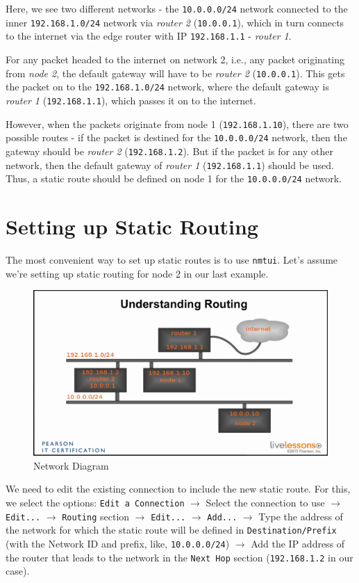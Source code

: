 \noindent
Here, we see two different networks - the \verb|10.0.0.0/24| network connected to the inner \verb|192.168.1.0/24| network via \textit{router 2} (\verb|10.0.0.1|), which in turn connects to the internet via the edge router with IP \verb|192.168.1.1| - \textit{router 1}. 

For any packet headed to the internet on network 2, i.e., any packet originating from \textit{node 2}, the default gateway will have to be \textit{router 2} (\verb|10.0.0.1|). This gets the packet on to the \verb|192.168.1.0/24| network, where the default gateway is \textit{router 1} (\verb|192.168.1.1|), which passes it on to the internet. 

However, when the packets originate from node 1 (\verb|192.168.1.10|), there are two possible routes - if the packet is destined for the \verb|10.0.0.0/24| network, then the gateway should be \textit{router 2} (\verb|192.168.1.2|). But if the packet is for any other network, then the default gateway of \textit{router 1} (\verb|192.168.1.1|) should be used. Thus, a static route should be defined on node 1 for the \verb|10.0.0.0/24| network. 

\section{Setting up Static Routing}
The most convenient way to set up static routes is to use \verb|nmtui|. Let's assume we're setting up static routing for node 2 in our last example.

\begin{figure}[H]
	\centering
	\includegraphics[width=0.9\linewidth]{Mod2/chapters/2.6.a}
	\caption{Network Diagram}
	\label{fig:2}
\end{figure}	

We need to edit the existing connection to include the new static route. For this, we select the options: \verb|Edit a Connection| $\rightarrow$ Select the connection to use $\rightarrow$ \verb|Edit...| $\rightarrow$ \verb|Routing| section $\rightarrow$ \verb|Edit...| $\rightarrow$ \verb|Add...| $\rightarrow$ Type the address of the network for which the static route will be defined in \verb|Destination/Prefix| (with the Network ID and prefix, like, \verb|10.0.0.0/24|) $\rightarrow$ Add the IP address of the router that leads to the network in the \verb|Next Hop| section (\verb|192.168.1.2| in our case). 

